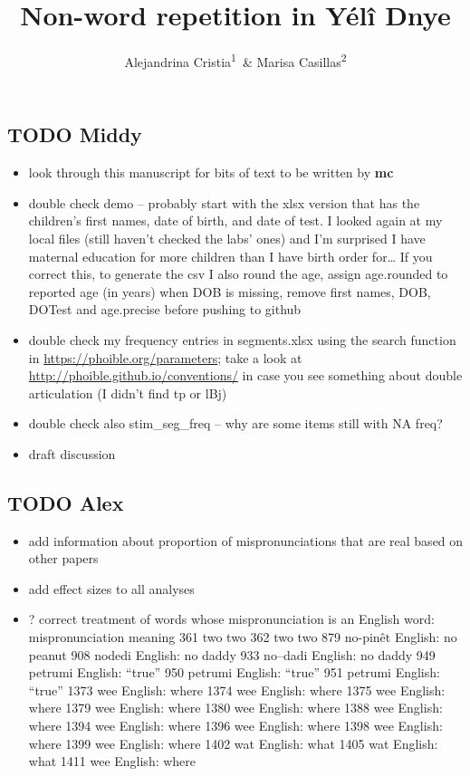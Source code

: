 \documentclass[english,,man,floatsintext]{apa6}
\title{Non-word repetition in Yélî Dnye}
\author{Alejandrina Cristia\textsuperscript{1}~\& Marisa Casillas\textsuperscript{2}}
\date{}
\providecommand{\tightlist}{%
  \setlength{\itemsep}{0pt}\setlength{\parskip}{0pt}}
\begin{document}
\maketitle

\hypertarget{todo-middy}{%
\subsection{TODO Middy}\label{todo-middy}}

\begin{itemize}
\tightlist
\item
  look through this manuscript for bits of text to be written by \textbf{mc}
\item
  double check demo -- probably start with the xlsx version that has the children's first names, date of birth, and date of test. I looked again at my local files (still haven't checked the labs' ones) and I'm surprised I have maternal education for more children than I have birth order for\ldots{} If you correct this, to generate the csv I also round the age, assign age.rounded to reported age (in years) when DOB is missing, remove first names, DOB, DOTest and age.precise before pushing to github
\item
  double check my frequency entries in segments.xlsx using the search function in \url{https://phoible.org/parameters}; take a look at \url{http://phoible.github.io/conventions/} in case you see something about double articulation (I didn't find tp or lBj)
\item
  double check also stim\_seg\_freq -- why are some items still with NA freq?
\item
  draft discussion
\end{itemize}

\hypertarget{todo-alex}{%
\subsection{TODO Alex}\label{todo-alex}}

\begin{itemize}
\tightlist
\item
  add information about proportion of mispronunciations that are real based on other papers
\item
  add effect sizes to all analyses
\item
  ? correct treatment of words whose mispronunciation is an English word:
  mispronunciation meaning
  361 two two
  362 two two
  879 no-pinêt English: no peanut
  908 nodedi English: no daddy
  933 no--dadi English: no daddy
  949 petrumi English: ``true''
  950 petrumi English: ``true''
  951 petrumi English: ``true''
  1373 wee English: where
  1374 wee English: where
  1375 wee English: where
  1379 wee English: where
  1380 wee English: where
  1388 wee English: where
  1394 wee English: where
  1396 wee English: where
  1398 wee English: where
  1399 wee English: where
  1402 wat English: what
  1405 wat English: what
  1411 wee English: where
\end{itemize}
\end{document}
